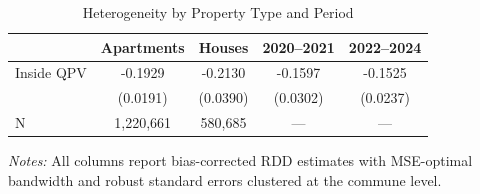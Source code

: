 \begin{table}[htbp]
\centering
\caption{Heterogeneity by Property Type and Period}
\label{tab:hetero}
\begin{threeparttable}
\begin{tabular}{lcccc}
\toprule
 & Apartments & Houses & 2020--2021 & 2022--2024 \\
\midrule
Inside QPV & -0.1929 & -0.2130 & -0.1597 & -0.1525 \\
 & (0.0191) & (0.0390) & (0.0302) & (0.0237) \\
\midrule
N & 1,220,661 & 580,685 & --- & --- \\
\bottomrule
\end{tabular}
\begin{tablenotes}
\small
\item \textit{Notes:} All columns report bias-corrected RDD estimates with MSE-optimal bandwidth and robust standard errors clustered at the commune level.
\end{tablenotes}
\end{threeparttable}
\end{table}
